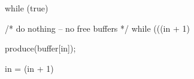 \documentclass[varwidth=22em,crop]{standalone}
\begin{document}
\begin{ccode}
while (true) {
  /* do nothing -- no free buffers */
  while (((in + 1) %

  produce(buffer[in]);

  in = (in + 1) %
}
\end{ccode}
\end{document}
